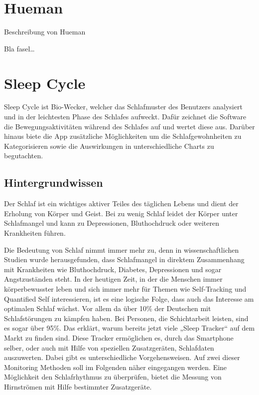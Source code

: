 \section{Hueman}
\label{ch:Apps:sec:Hueman}

Beschreibung von Hueman

Bla fasel\ldots

\section{Sleep Cycle}
\label{ch:Apps:sec:SleepCycle}

Sleep Cycle ist Bio-Wecker, welcher das Schlafmuster des Benutzers analysiert und in der leichtesten Phase des Schlafes aufweckt.
Dafür zeichnet die Software die Bewegungsaktivitäten während des Schlafes auf und wertet diese aus.
Darüber hinaus biete die App zusätzliche Möglichkeiten um die Schlafgewohnheiten zu Kategorisieren sowie die Auswirkungen in unterschiedliche Charts zu begutachten. \cite{Chen:SleepMonitoring}

\subsection{Hintergrundwissen}
\label{ch:Apps:sec:Sleepcycle:subsec:H}

Der Schlaf ist ein wichtiges aktiver Teiles des täglichen Lebens und dient der Erholung von Körper und Geist.
Bei zu wenig Schlaf leidet der Körper unter Schlafmangel und kann zu Depressionen, Bluthochdruck oder weiteren Krankheiten führen. 

Die Bedeutung von Schlaf nimmt immer mehr zu, denn in wissenschaftlichen Studien wurde herausgefunden, dass Schlafmangel in direktem Zusammenhang mit Krankheiten wie Bluthochdruck, Diabetes, Depressionen und sogar Angstzuständen steht.
In der heutigen Zeit, in der die Menschen immer körperbewusster leben und sich immer mehr für Themen wie  Self-Tracking und Quantified Self  interessieren, ist es eine logische Folge, dass auch das Interesse am optimalen Schlaf  wächst.
Vor allem da über 10\% der Deutschen mit Schlafstörungen zu kämpfen haben. Bei Personen, die Schichtarbeit leisten, sind es sogar über 95\%.
Das erklärt, warum bereits jetzt viele „Sleep Tracker“  auf dem Markt zu finden sind.
Diese Tracker ermöglichen es, durch das Smartphone selber, oder auch mit Hilfe von speziellen Zusatzgeräten, Schlafdaten auszuwerten.
Dabei gibt es unterschiedliche Vorgehensweisen.
Auf zwei dieser Monitoring Methoden soll im Folgenden näher eingegangen werden.
Eine Möglichkeit den Schlafrhythmus zu überprüfen, bietet die Messung von Hirnströmen mit Hilfe bestimmter Zusatzgeräte.



